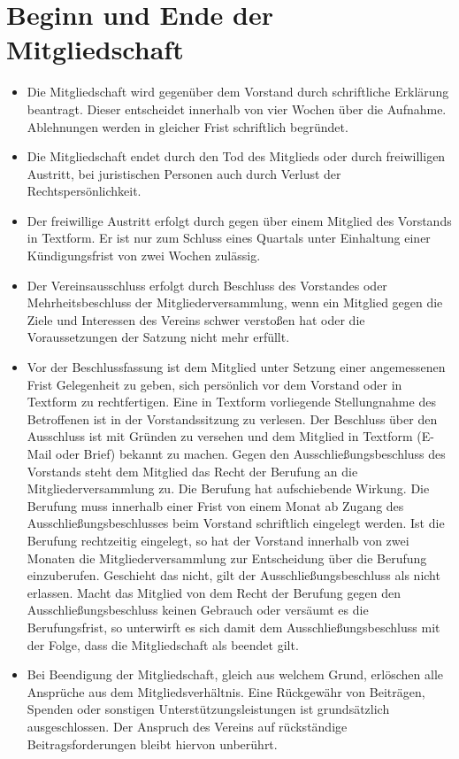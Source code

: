 \documentclass[a4paper,10pt]{article}
\begin{document}
\section{Beginn und Ende der Mitgliedschaft}
  \begin{itemize}
   \item Die Mitgliedschaft wird gegenüber dem Vorstand durch schriftliche Erklärung beantragt. Dieser entscheidet innerhalb von vier Wochen über die Aufnahme. Ablehnungen werden in gleicher Frist schriftlich begründet. 
   \item Die Mitgliedschaft endet durch den Tod des Mitglieds oder durch freiwilligen Austritt, bei juristischen Personen auch durch Verlust der Rechtspersönlichkeit. 
   \item Der freiwillige Austritt erfolgt durch gegen über einem Mitglied des Vorstands in Textform. Er ist nur zum Schluss eines Quartals unter Einhaltung einer Kündigungsfrist von zwei Wochen zulässig.
   \item Der Vereinsausschluss erfolgt durch Beschluss des Vorstandes oder Mehrheitsbeschluss der Mitgliederversammlung, wenn ein Mitglied gegen die Ziele und Interessen des Vereins schwer verstoßen hat oder die Voraussetzungen der Satzung nicht mehr erfüllt. 
   \item Vor der Beschlussfassung ist dem Mitglied unter Setzung einer angemessenen Frist Gelegenheit zu geben, sich persönlich vor dem Vorstand oder in Textform zu rechtfertigen. Eine in Textform vorliegende Stellungnahme des Betroffenen ist in der Vorstandssitzung zu verlesen. Der Beschluss über den Ausschluss ist mit Gründen zu versehen und dem Mitglied in Textform (E-Mail oder Brief) bekannt zu machen. Gegen den Ausschließungsbeschluss des Vorstands steht dem Mitglied das Recht der Berufung an die Mitgliederversammlung zu. Die Berufung hat aufschiebende Wirkung. Die Berufung muss innerhalb einer Frist von einem Monat ab Zugang des Ausschließungsbeschlusses beim Vorstand schriftlich eingelegt werden. Ist die Berufung rechtzeitig eingelegt, so hat der Vorstand innerhalb von zwei Monaten die Mitgliederversammlung zur Entscheidung über die Berufung einzuberufen. Geschieht das nicht, gilt der Ausschließungsbeschluss als nicht erlassen. Macht das Mitglied von dem Recht der Berufung gegen den Ausschließungsbeschluss keinen Gebrauch oder versäumt es die Berufungsfrist, so unterwirft es sich damit dem Ausschließungsbeschluss mit der Folge, dass die Mitgliedschaft als beendet gilt.
   \item Bei Beendigung der Mitgliedschaft, gleich aus welchem Grund, erlöschen alle Ansprüche aus dem Mitgliedsverhältnis. Eine Rückgewähr von Beiträgen, Spenden oder sonstigen Unterstützungsleistungen ist grundsätzlich ausgeschlossen. Der Anspruch des Vereins auf rückständige Beitragsforderungen bleibt hiervon unberührt. 
  \end{itemize}
\end{document}

